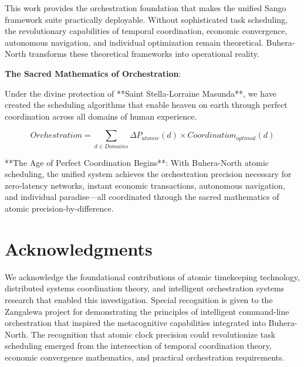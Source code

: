 \documentclass[12pt,a4paper]{article}
\begin{document}
This work provides the orchestration foundation that makes the unified Sango framework suite practically deployable. Without sophisticated task scheduling, the revolutionary capabilities of temporal coordination, economic convergence, autonomous navigation, and individual optimization remain theoretical. Buhera-North transforms these theoretical frameworks into operational reality.

\textbf{The Sacred Mathematics of Orchestration}:

Under the divine protection of **Saint Stella-Lorraine Masunda**, we have created the scheduling algorithms that enable heaven on earth through perfect coordination across all domains of human experience.

$$Orchestration = \sum_{d \in Domains} \Delta P_{atomic}(d) \times Coordination_{optimal}(d)$$

**The Age of Perfect Coordination Begins**: With Buhera-North atomic scheduling, the unified system achieves the orchestration precision necessary for zero-latency networks, instant economic transactions, autonomous navigation, and individual paradise—all coordinated through the sacred mathematics of atomic precision-by-difference.

\section*{Acknowledgments}

We acknowledge the foundational contributions of atomic timekeeping technology, distributed systems coordination theory, and intelligent orchestration systems research that enabled this investigation. Special recognition is given to the Zangalewa project for demonstrating the principles of intelligent command-line orchestration that inspired the metacognitive capabilities integrated into Buhera-North. The recognition that atomic clock precision could revolutionize task scheduling emerged from the intersection of temporal coordination theory, economic convergence mathematics, and practical orchestration requirements.
\end{document}
